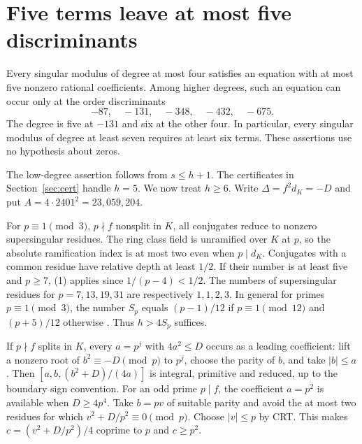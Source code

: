 \section{Five terms leave at most five discriminants}\label{sec:five}
\begin{theorem}\label{th:five}
Every singular modulus of degree at most four satisfies an equation with at most five nonzero rational coefficients. Among higher degrees, such an equation can occur only at the order discriminants
\[
              -87,\quad -131,\quad -348,\quad -432,\quad -675.
\]
The degree is five at $-131$ and six at the other four. In particular, every singular modulus of degree at least seven requires at least six terms. These assertions use no hypothesis about zeros.
\end{theorem}
The low-degree assertion follows from $s\le h+1$. The certificates in Section~\ref{sec:cert} handle $h=5$. We now treat $h\ge6$. Write $\Delta=f^2d_K=-D$ and put $A=4\cdot2401^2=23{,}059{,}204$.

 For $p\equiv1\pmod3$, $p\nmid f$ nonsplit in $K$, all conjugates reduce to nonzero supersingular residues. The ring class field is unramified over $K$ at $p$, so the absolute ramification index is at most two even when $p\mid d_K$. Conjugates with a common residue have relative depth at least $1/2$. If their number is at least five and $p\ge7$, (1) applies since $1/(p-4)<1/2$. The numbers of supersingular residues for $p=7,13,19,31$ are respectively $1,1,2,3$. In general for primes $p\equiv1\pmod3$, the number $S_p$ equals $(p-1)/12$ if $p\equiv1\pmod{12}$ and $(p+5)/12$ otherwise \cite{deuring}. Thus $h>4S_p$ suffices.

 If $p\nmid f$ splits in $K$, every $a=p^j$ with $4a^2\le D$ occurs as a leading coefficient: lift a nonzero root of $b^2\equiv-D\pmod p$ to $p^j$, choose the parity of $b$, and take $|b|\le a$. Then $[a,b,(b^2+D)/(4a)]$ is integral, primitive and reduced, up to the boundary sign convention. For an odd prime $p\mid f$, the coefficient $a=p^2$ is available when $D\ge4p^4$. Take $b=pv$ of suitable parity and avoid the at most two residues for which $v^2+D/p^2\equiv0\pmod p$. Choose $|v|\le p$ by CRT. This makes $c=(v^2+D/p^2)/4$ coprime to $p$ and $c\ge p^2$.


